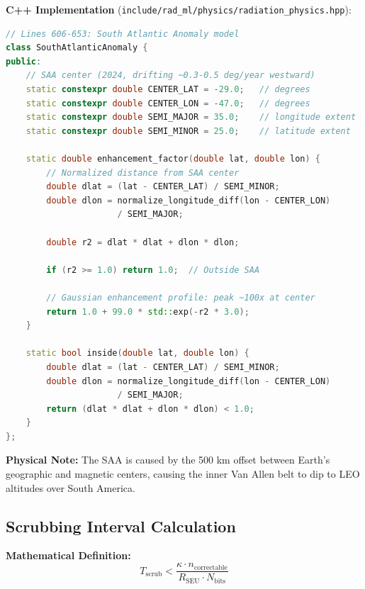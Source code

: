 \documentclass[11pt,a4paper]{article}
\begin{document}
\textbf{C++ Implementation} (\texttt{include/rad\_ml/physics/radiation\_physics.hpp}):
\begin{lstlisting}[language=C++, basicstyle=\small\ttfamily]
// Lines 606-653: South Atlantic Anomaly model
class SouthAtlanticAnomaly {
public:
    // SAA center (2024, drifting ~0.3-0.5 deg/year westward)
    static constexpr double CENTER_LAT = -29.0;   // degrees
    static constexpr double CENTER_LON = -47.0;   // degrees
    static constexpr double SEMI_MAJOR = 35.0;    // longitude extent
    static constexpr double SEMI_MINOR = 25.0;    // latitude extent

    static double enhancement_factor(double lat, double lon) {
        // Normalized distance from SAA center
        double dlat = (lat - CENTER_LAT) / SEMI_MINOR;
        double dlon = normalize_longitude_diff(lon - CENTER_LON)
                      / SEMI_MAJOR;

        double r2 = dlat * dlat + dlon * dlon;

        if (r2 >= 1.0) return 1.0;  // Outside SAA

        // Gaussian enhancement profile: peak ~100x at center
        return 1.0 + 99.0 * std::exp(-r2 * 3.0);
    }

    static bool inside(double lat, double lon) {
        double dlat = (lat - CENTER_LAT) / SEMI_MINOR;
        double dlon = normalize_longitude_diff(lon - CENTER_LON)
                      / SEMI_MAJOR;
        return (dlat * dlat + dlon * dlon) < 1.0;
    }
};
\end{lstlisting}

\textbf{Physical Note:} The SAA is caused by the 500 km offset between Earth's geographic and magnetic centers, causing the inner Van Allen belt to dip to LEO altitudes over South America.

\subsection{Scrubbing Interval Calculation}

\textbf{Mathematical Definition:}
\begin{equation}
T_{\text{scrub}} < \frac{\kappa \cdot n_{\text{correctable}}}{R_{\text{SEU}} \cdot N_{\text{bits}}}
\end{equation}
\end{document}
